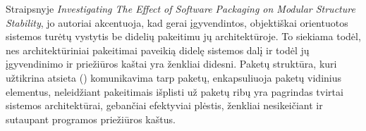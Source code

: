 Straipsnyje \textit{Investigating The Effect of Software Packaging on Modular Structure Stability}, jo autoriai akcentuoja, kad
gerai įgyvendintos, objektiškai orientuotos sistemos turėtų vystytis be didelių pakeitimu jų architektūroje.
To siekiama todėl, nes architektūriniai pakeitimai paveikią didelę sistemos dalį ir todėl
jų įgyvendinimo ir priežiūros kaštai yra ženkliai didesni\cite{ModularStability}.
Paketų struktūra, kuri užtikrina atsieta () komunikavima tarp paketų, enkapsuliuoja paketų vidinius elementus, neleidžiant pakeitimais
išplisti už paketų ribų yra pagrindas tvirtai sistemos architektūrai, gebančiai efektyviai plėstis, ženkliai nesikeičiant ir sutaupant programos priežiūros kaštus.
